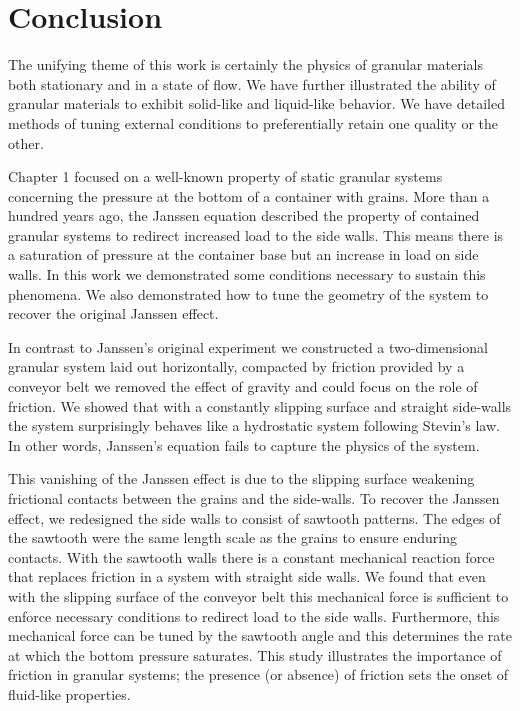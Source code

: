 \chapter{Conclusion}

The unifying theme of this work is certainly the physics of granular materials both stationary and in a state of flow. We have further illustrated the ability of granular materials to exhibit solid-like and liquid-like behavior. We have detailed methods of tuning external conditions to preferentially retain one quality or the other. 

Chapter 1 focused on a well-known property of static granular systems concerning the pressure at the bottom of a container with grains. More than a hundred years ago, the Janssen equation described the property of contained granular systems to redirect increased load to the side walls. This means there is a saturation of pressure at the container base but an increase in load on side walls. In this work we demonstrated some conditions necessary to sustain this phenomena. We also demonstrated how to tune the geometry of the system to recover the original Janssen effect. 

In contrast to Janssen’s original experiment we constructed a two-dimensional granular system laid out horizontally, compacted by friction provided by a conveyor belt we removed the effect of gravity and could focus on the role of friction. We showed that with a constantly slipping surface and straight side-walls the system surprisingly behaves like a hydrostatic system following Stevin’s law. In other words, Janssen’s equation fails to capture the physics of the system. 

This vanishing of the Janssen effect is due to the slipping surface weakening frictional contacts between the grains and the side-walls. To recover the Janssen effect, we redesigned the side walls to consist of sawtooth patterns. The edges of the sawtooth were the same length scale as the grains to ensure enduring contacts. With the sawtooth walls there is a constant mechanical reaction force that replaces friction in a system with straight side walls. We found that even with the slipping surface of the conveyor belt this mechanical force is sufficient to enforce necessary conditions to redirect load to the side walls. Furthermore, this mechanical force can be tuned by the sawtooth angle and this determines the rate at which the bottom pressure saturates. This study illustrates the importance of friction in granular systems; the presence (or absence) of friction sets the onset of fluid-like properties. 

